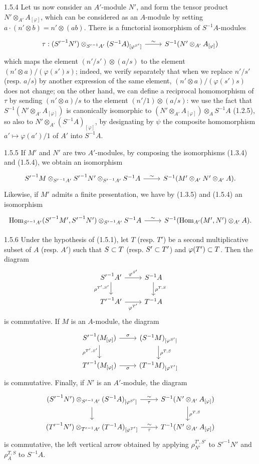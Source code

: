 \documentclass[../main.tex]{subfiles}
\begin{document}
\begin{cx}{1.5.4}
Let us now consider an $A'$-module $N'$, and form the tensor product $N'\otimes_{A'}A_{[\varphi]}$,
which can be considered as an $A$-module by setting $a\cdot(n'\otimes b)=n'\otimes(ab)$. There is a
functorial isomorphism of $S^{-1}A$-modules
\[\TI
  \tau:({S'}^{-1}N')\otimes_{{S'}^{-1}A'}(S^{-1}A)_{[\varphi^{S'}]}\ar[r,"\sim"] &
  S^{-1}(N'\otimes_{A'}A_{[\varphi]})
\TE\]
which maps the element $(n'/s')\otimes(a/s)$ to the element $(n'\otimes a)/(\varphi(s')s)$;
indeed, we verify separately that when we replace $n'/s'$ (resp. $a/s$) by another expression of the
same element, $(n'\otimes a)/(\varphi(s')s)$ does not change; on the other hand, we can define a
reciprocal homomorphism of $\tau$ by sending $(n'\otimes a)/s$ to the element $(n'/1)\otimes(a/s)$:
we use the fact that $S^{-1}(N'\otimes_{A'}A_{[\varphi]})$ is canonically isomorphic to
$(N'\otimes_{A'}A_{[\varphi]})\otimes_A S^{-1}A$ (1.2.5), so also to $N'\otimes_{A'}(S^{-1}A)_{[\varphi]}$,
by designating by $\psi$ the composite homomorphism $a'\mapsto\varphi(a')/1$ of $A'$ into $S^{-1}A$.
\end{cx}

\begin{cx}{1.5.5}
If $M'$ and $N'$ are two $A'$-modules, by composing the isomorphisms (1.3.4) and (1.5.4), we obtain
an isomorphism
\[\TI
  {S'}^{-1}M\otimes_{{S'}^{-1}A'}{S'}^{-1}N'\otimes_{{S'}^{-1}A'}S^{-1}A\ar[r,"\sim"] &
  S^{-1}(M'\otimes_{A'}N'\otimes_{A'}A).
\TE\]
Likewise, if $M'$ admits a finite presentation, we have by (1.3.5) and (1.5.4) an isomorphism
\[\TI
  \Hom_{{S'}^{-1}A'}({S'}^{-1}M',{S'}^{-1}N')\otimes_{{S'}^{-1}A'}S^{-1}A\ar[r,"\sim"] &
  S^{-1}(\Hom_{A'}(M',N')\otimes_{A'}A).
\TE\]
\end{cx}

\begin{cx}{1.5.6}
Under the hypothesis of (1.5.1), let $T$ (resp. $T'$) be a second multiplicative subset of $A$
(resp. $A'$) such that $S\subset T$ (resp. $S'\subset T'$) and $\varphi(T')\subset T$. Then the diagram
\[\TI
  {S'}^{-1}A'\ar[r,"\varphi^{S'}"]\ar[d,"\rho^{T',S'}"'] & S^{-1}A\ar[d,"\rho^{T,S}"]\\
  {T'}^{-1}A'\ar[r,"\varphi^{T'}"'] & T^{-1}A
\TE\]
is commutative. If $M$ is an $A$-module, the diagram
\[\TI
  {S'}^{-1}(M_{[\varphi]})\ar[r,"\sigma"]\ar[d,"\rho^{T',S'}"'] &
  (S^{-1}M)_{[\varphi^{S'}]}\ar[d,"\rho^{T,S}"]\\
  {T'}^{-1}(M_{[\varphi]})\ar[r,"\sigma"'] & (T^{-1}M)_{[\varphi^{T'}]}
\TE\]
is commutative. Finally, if $N'$ is an $A'$-module, the diagram
\[\TI
  ({S'}^{-1}N')\otimes_{{S'}^{-1}A'}(S^{-1}A)_{[\varphi^{S'}]}
  \ar[r,"\sim","\tau"'] \ar[d] &
  S^{-1}(N'\otimes_{A'}A_{[\varphi]})\ar[d,"\rho^{T,S}"]\\
  ({T'}^{-1}N')\otimes_{{T'}^{-1}A'}(T^{-1}A)_{[\varphi^{T'}]}
  \ar[r,"\sim","\tau"'] & T^{-1}(N'\otimes_{A'}A_{[\varphi]})
\TE\]
is commutative, the left vertical arrow obtained by applying
$\rho_{N'}^{T',S'}$ to ${S'}^{-1}N'$ and $\rho_A^{T,S}$ to $S^{-1}A$.
\end{cx}
\end{document}
